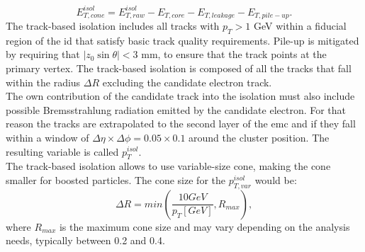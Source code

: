 	\begin{equation}
		E^{isol}_{T,cone}=E^{isol}_{T,raw}-E_{T,core}-E_{T,leakage}-E_{T,pile-up}.
	\end{equation}
	The track-based isolation includes all tracks with $p_T>1$ GeV within a fiducial region of the \gls{id} that satisfy basic track quality requirements. Pile-up is mitigated by requiring that $|z_0\sin{\theta}|<3$ mm, to ensure that the track points at the primary vertex. The track-based isolation is composed of all the tracks that fall within the radius $\Delta R$ excluding the candidate electron track.\\
	The own contribution of the candidate track into the isolation must also include possible Bremsstrahlung radiation emitted by the candidate electron. For that reason the tracks are extrapolated to the second layer of the \gls{emc} and if they fall within a window of $\Delta \eta \times \Delta \phi = 0.05 \times 0.1$ around the cluster position. The resulting variable is called $p_T^{isol}$.\\
	The track-based isolation allows to use variable-size cone, making the cone smaller for boosted particles. The cone size for the $p_{T,var}^{isol}$ would be:
	\begin{equation}
		\Delta R=min\left(\frac{10 GeV}{p_T[GeV]},R_{max}\right),
	\end{equation}
	where $R_{max}$ is the maximum cone size and may vary depending on the analysis needs, typically between 0.2 and 0.4.
